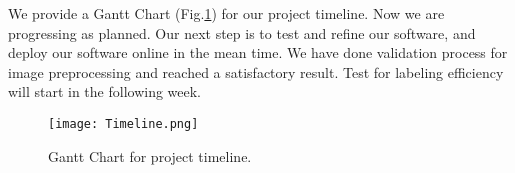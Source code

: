 We provide a Gantt Chart (Fig.\ref{fig:timeline}) for our project timeline. Now we are progressing as planned. Our next step is to test and refine our software, and deploy our software online in the mean time. We have done validation process for image preprocessing and reached a satisfactory result. Test for labeling efficiency will start in the following week.

\begin{figure}[htbp]
  \centering \texttt{[image: Timeline.png]}
  \caption{Gantt Chart for project timeline.}
  \label{fig:timeline}
\end{figure}